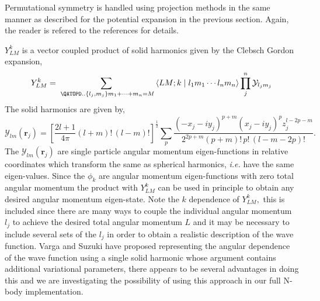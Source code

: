\documentclass[12pt,thmsa]{article}
\begin{document}
Permutational symmetry is handled using projection methods in the same
manner as described for the potential expansion in the previous section.
Again, the reader is refered to the references for details\cite
{Poshusta83,Kinghorn93,Kinghorn95b}.

$Y_{LM}^k$ is a vector coupled product of solid harmonics\cite{Biedenharn81}
given by the Clebsch Gordon expansion, 
\begin{equation}
Y_{LM}^k=\sum_{\,\,\QATOPD. . {\left\{ l_j,m_j\right\} }{m_1+\cdots
+m_n=M}}\left\langle LM;k\right. |\left. l_1m_1\cdots l_nm_n\right\rangle
\prod_j^n\mathcal{Y}_{l_jm_j}
\end{equation}
The solid harmonics are given by, 
\begin{equation}
\mathcal{Y}_{lm}\left( \mathbf{r}_j\right) =\left[ \frac{2l+1}{4\pi }\left(
l+m\right) !\,\left( l-m\right) !\right] ^{\frac 12}\sum_p\frac{\left(
-x_j-iy_j\right) ^{p+m}\left( x_j-iy_j\right) ^pz_j^{l-2p-m}}{2^{2p+m}\left(
p+m\right) !\,p!\,\left( l-m-2p\right) !}.
\end{equation}
The $\mathcal{Y}_{lm}\left( \mathbf{r}_j\right) $ are single particle
angular momentum eigen-functions in relative coordinates which transform the
same as spherical harmonics, \textit{i.e.} have the same eigen-values. Since
the $\phi _k$ are angular momentum eigen-functions with zero total angular
momentum the product with $Y_{LM}^k$ can be used in principle to obtain any
desired angular momentum eigen-state. Note the $k$ dependence of $Y_{LM}^k,$
this is included since there are many ways to couple the individual angular
momentum $l_j$ to achieve the desired total angular momentum $L$ and it may
be necessary to include several sets of the $l_j$ in order to obtain a
realistic description of the wave function. Varga and Suzuki\cite{Varga95}
have proposed representing the angular dependence of the wave function using
a single solid harmonic whose argument contains additional variational
parameters, there appears to be several advantages in doing this and we are
investigating the possibility of using this approach in our full N-body
implementation.
\end{document}
